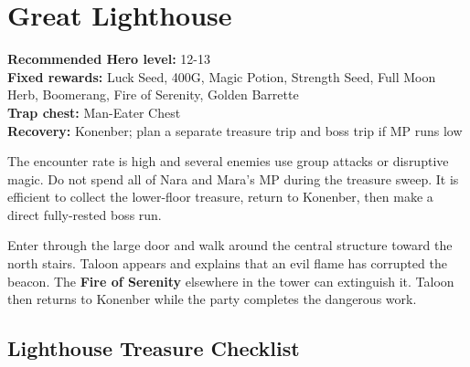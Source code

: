 \documentclass[
  american,
  10pt,
  letterpaper,
  oneside,
  open=any]{scrreprt}
\begin{document}
\section{Great Lighthouse}\label{great-lighthouse}

\textbf{Recommended Hero level:} 12-13\\
\textbf{Fixed rewards:} Luck Seed, 400G, Magic Potion, Strength Seed,
Full Moon Herb, Boomerang, Fire of Serenity, Golden Barrette\\
\textbf{Trap chest:} Man-Eater Chest\\
\textbf{Recovery:} Konenber; plan a separate treasure trip and boss trip
if MP runs low

The encounter rate is high and several enemies use group attacks or
disruptive magic. Do not spend all of Nara and Mara's MP during the
treasure sweep. It is efficient to collect the lower-floor treasure,
return to Konenber, then make a direct fully-rested boss run.

Enter through the large door and walk around the central structure
toward the north stairs. Taloon appears and explains that an evil flame
has corrupted the beacon. The \textbf{Fire of Serenity} elsewhere in the
tower can extinguish it. Taloon then returns to Konenber while the party
completes the dangerous work.

\subsection{Lighthouse Treasure
Checklist}\label{lighthouse-treasure-checklist}
\end{document}
